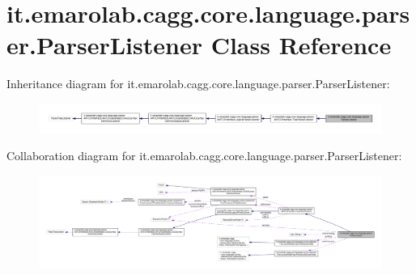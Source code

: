 \hypertarget{classit_1_1emarolab_1_1cagg_1_1core_1_1language_1_1parser_1_1ParserListener}{\section{it.\-emarolab.\-cagg.\-core.\-language.\-parser.\-Parser\-Listener Class Reference}
\label{classit_1_1emarolab_1_1cagg_1_1core_1_1language_1_1parser_1_1ParserListener}
}


Inheritance diagram for it.\-emarolab.\-cagg.\-core.\-language.\-parser.\-Parser\-Listener\-:\nopagebreak
\begin{figure}[H]
\begin{center}
\leavevmode
\includegraphics[width=350pt]{classit_1_1emarolab_1_1cagg_1_1core_1_1language_1_1parser_1_1ParserListener__inherit__graph}
\end{center}
\end{figure}


Collaboration diagram for it.\-emarolab.\-cagg.\-core.\-language.\-parser.\-Parser\-Listener\-:\nopagebreak
\begin{figure}[H]
\begin{center}
\leavevmode
\includegraphics[width=350pt]{classit_1_1emarolab_1_1cagg_1_1core_1_1language_1_1parser_1_1ParserListener__coll__graph}
\end{center}
\end{figure}
